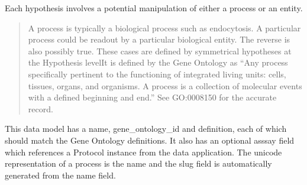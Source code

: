 \documentclass[letterpaper,10pt,english]{sphinxmanual}
\begin{document}
\begin{fulllineitems}
\label{api:experimentdb.hypotheses.models.Process}
Each hypothesis involves a potential manipulation of either a process or an entity.

\begin{quote}

A process is typically a biological process such as endocytosis.  A particular process could be readout by a particular biological entity.  The reverse is also possibly true.  These cases are defined by symmetrical hypotheses at the Hypothesis levelIt is defined by the Gene Ontology as ``Any process specifically pertinent to the functioning of integrated living units: cells, tissues, organs, and organisms. A process is a collection of molecular events with a defined beginning and end.'' See GO:0008150 for the accurate record.

\end{quote}

This data model has a name, gene\_ontology\_id and definition, each of which should match the Gene Ontology definitions.  It also has an optional asssay field which references a Protocol instance from the data application.  The unicode representation of a process is the name and the slug field is automatically generated from the name field.


\begin{fulllineitems}
\label{api:experimentdb.hypotheses.models.Process.DoesNotExist}
\end{fulllineitems}


\begin{fulllineitems}
\label{api:experimentdb.hypotheses.models.Process.MultipleObjectsReturned}
\end{fulllineitems}


\begin{fulllineitems}
\label{api:experimentdb.hypotheses.models.Process.assay}
\end{fulllineitems}


\end{fulllineitems}
\end{document}
